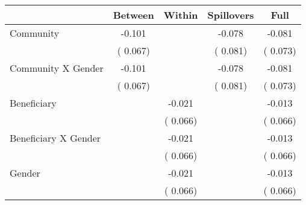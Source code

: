 
\begin{tabular}{l*{4}{c}}\hline&\multicolumn{1}{c}{Between}&\multicolumn{1}{c}{Within}&\multicolumn{1}{c}{Spillovers}&\multicolumn{1}{c}{Full}\\ \hline
 Community                                     &             -0.101      &                                               &       -0.078 &        -0.081                            \\ 
                                                       &        (       0.067)           &                                       &       (       0.081)     &      (       0.073)                                           \\ 
 Community X Gender            &             -0.101      &                                               &       -0.078 &        -0.081                            \\ 
                                                       &        (       0.067)           &                                       &       (       0.081)     &      (       0.073)                                           \\ 
 Beneficiary                           &                                               &       -0.021    &                                &            -0.013                            \\ 
                                                       &                                               & (       0.066)                  &                                        &      (       0.066)                                           \\ 
 Beneficiary X Gender          &                                               &       -0.021    &                                &            -0.013                            \\ 
                                                       &                                               & (       0.066)                  &                                        &      (       0.066)                                           \\ 
 Gender                                        &                              &       -0.021    &                                &            -0.013                            \\ 
                                                       &                                               & (       0.066)                  &                                        &      (       0.066)                                           \\ 

\end{tabular}
